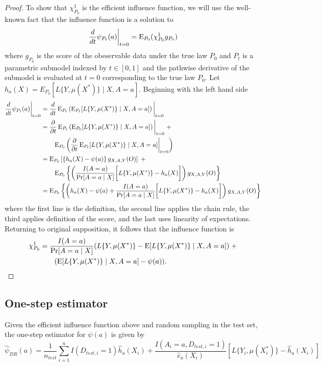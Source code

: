 \begin{proof}
To show that $\chi_{P_0}^1$ is the efficient influence function, we will use the well-known fact that the influence function is a solution to 
\begin{equation*}
    \frac{d}{dt} \psi_{P_t}(a)\bigg\vert_{t=0} = \operatorname{E}_{P_0}(\chi_{P_0}^1g_{P_0})
\end{equation*}
where $g_{P_0}$ is the score of the obeservable data under the true law $P_0$ and $P_t$ is a parametric submodel indexed by $t \in [0,1]$ and the pathwise derivative of the submodel is evaluated at $t = 0$ corresponding to the true law $P_0$. Let $h_a(X) = E_{P_0}[L\{Y, \mu(X^*)\} \mid X, A=a]$. Beginning with the left hand side
\begin{align*}
    \frac{d}{dt} \psi_{P_t}(a)\bigg\vert_{t=0} &=\frac{d}{dt} \operatorname{E}_{P_t}\left(\operatorname{E}_{P_t}[L\{Y, \mu(X^*)\} \mid X, A=a] \right)\bigg\vert_{t=0} \\
    &=\frac{\partial}{\partial t} \operatorname{E}_{P_t}\left(\operatorname{E}_{P_0}[L\{Y, \mu(X^*)\} \mid X, A=a] \right)\bigg\vert_{t=0} \;+ \\
    &\qquad  \operatorname{E}_{P_0}\left(\frac{\partial}{\partial t} \operatorname{E}_{P_t}[L\{Y, \mu(X^*)\} \mid X, A=a] \bigg\vert_{t=0} \right) \\
    &=\operatorname{E}_{P_0}\left[\left\{h_a(X) - \psi(a) \right\}g_{X, A, Y}(O)\right] \;+ \\
    &\qquad  \operatorname{E}_{P_0}\left\{\left( \frac{I(A = a)}{\Pr[A = a \mid X]} \bigg[L\{Y, \mu(X^*)\} - h_a(X) \bigg]\right)g_{X, A, Y}(O)\right\} \\
    &= \operatorname{E}_{P_0}\left\{\left(h_a(X) - \psi(a) + \frac{I(A = a)}{\Pr[A = a \mid X]} \bigg[L\{Y, \mu(X^*)\} - h_a(X) \bigg]\right)g_{X, A, Y}(O)\right\} 
\end{align*}
where the first line is the definition, the second line applies the chain rule, the third applies definition of the score, and the last uses linearity of expectations. Returning to original supposition, it follows that the influence function is 
\begin{align*}
    \chi_{P_0}^1 &= \frac{I(A = a)}{\Pr[A = a \mid X]}(L\{Y, \mu(X^*)\} - \operatorname{E}[L\{Y, \mu(X^*)\} \mid X, A=a])  \; + \\
    & \qquad (\operatorname{E}[L\{Y, \mu(X^*)\} \mid X, A=a] - \psi(a)).
\end{align*}
\end{proof}

\subsection{One-step estimator}
Given the efficient influence function above and  random sampling in the test set, the one-step estimator for $\psi(a)$ is given by
\begin{equation*}
    \widehat{\psi}_{DR}(a) = \frac{1}{n_{test}}\sum_{i=1}^n I(D_{test, i} = 1)\widehat{h}_a(X_i) + \frac{I(A_i = a, D_{test, i} = 1)}{\widehat{e}_a(X_i)} \left[ L\{Y_i, \mu(X^*_i)\} - \widehat{h}_a(X_i)\right]
\end{equation*}

